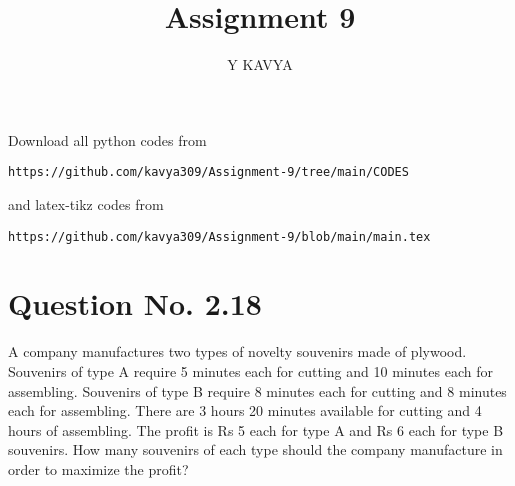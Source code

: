 \documentclass[journal,12pt,twocolumn]{IEEEtran}
\begin{document}
\makeatother
\let\StandardTheFigure\thefigure
\let\vec\mathbf
\renewcommand{\thefigure}{\theproblem}
\def\putbox#1#2#3{\makebox[0in][l]{\makebox[#1][l]{}\raisebox{\baselineskip}[0in][0in]{\raisebox{#2}[0in][0in]{#3}}}}
     \def\rightbox#1{\makebox[0in][r]{#1}}
     \def\centbox#1{\makebox[0in]{#1}}
     \def\topbox#1{\raisebox{-\baselineskip}[0in][0in]{#1}}
     \def\midbox#1{\raisebox{-0.5\baselineskip}[0in][0in]{#1}}
\vspace{3cm}
\title{Assignment 9}
\author{Y KAVYA}
\maketitle
\newpage
\bigskip
\renewcommand{\thefigure}{\theenumi}
\renewcommand{\thetable}{\theenumi}
Download all python codes from 
\begin{lstlisting}
https://github.com/kavya309/Assignment-9/tree/main/CODES
\end{lstlisting}
%
and latex-tikz codes from 
%
\begin{lstlisting}
https://github.com/kavya309/Assignment-9/blob/main/main.tex
\end{lstlisting}
%
\section{Question No. 2.18}
A company manufactures two types of novelty souvenirs made of plywood. Souvenirs of type A require 5 minutes each for cutting and 10 minutes each for assembling. Souvenirs of type B require 8 minutes each for cutting and 8 minutes each for assembling. There are 3 hours 20 minutes available for cutting and 4 hours of assembling. The profit is Rs 5 each for type A and Rs 6 each for type B souvenirs. How many souvenirs of each type should the company manufacture in order to maximize the profit?
%
\end{document}
